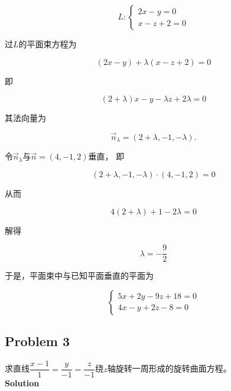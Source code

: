 \documentclass[
	11pt, %
	a4paper, %
]{WhuSakuraBook}
\begin{document}
    $$
        L:\left\{\begin{array}{l}
        2 x-y=0 \\
        x-z+2=0
        \end{array}\right.
    $$

    过\(L\)的平面束方程为

    \[
        \left(2x-y\right) + \lambda \left(x-z+2\right) = 0
    \]

    即

    \[
        (2+\lambda) x-y-\lambda z+2 \lambda=0
    \]

    其法向量为

    $$
        \overrightarrow{n}_\lambda=(2+\lambda,-1,-\lambda) .
    $$

    令\(\overrightarrow{n}_\lambda\)与\(\overrightarrow{n} = \left(4,-1,2\right)\)垂直，
    即

    $$
        (2+\lambda,-1,-\lambda) \cdot(4,-1,2)=0
    $$

    从而

    $$
        4(2+\lambda)+1-2 \lambda=0
    $$

    解得

    \[
        \lambda = -\frac{9}{2}
    \]

    于是，平面束中与已知平面垂直的平面为

    $$
        \left\{\begin{array}{l}
        5 x+2y-9 z+18=0 \\
        4 x-y+2 z-8=0
        \end{array}\right.
    $$

\subsection{Problem 3}

    求直线$\dfrac{x-1}{1}=\dfrac{y}{-1}=\dfrac{z}{-1}$绕\(z\)轴旋转一周形成的旋转曲面方程。
    \\

    \textbf{Solution}
    \\
\end{document}
